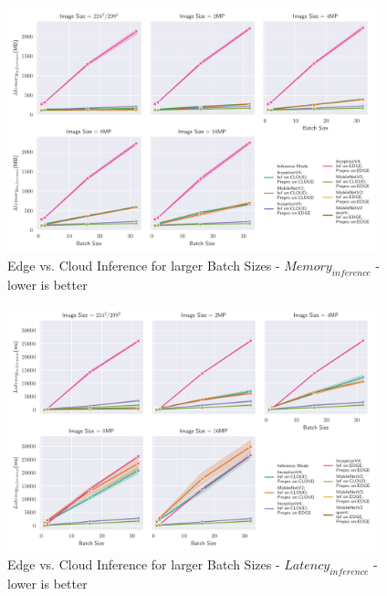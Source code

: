 \begin{figure}[!htb]
\centering
\includegraphics[width=0.95\textwidth]{./Bilder/single_plots/batch_size_plots/Effects_of_Batch_size_Inference_Memory.pdf}
\caption{Edge vs. Cloud Inference for larger Batch Sizes -  $Memory_{inference}$ - lower is better}
\label{fig:BatchSizeInferenceMemory}
\end{figure}
\begin{figure}[!htb]
\centering
\includegraphics[width=0.95\textwidth]{./Bilder/single_plots/batch_size_plots/Effects_of_Batch_size_Inference_Latencies.pdf}
\caption{Edge vs. Cloud Inference for larger Batch Sizes -  $Latency_{inference}$ - lower is better}
\label{fig:BatchSizeInferenceLatency}
\end{figure}



